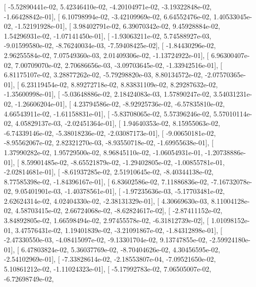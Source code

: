 \documentclass{article}
\begin{document}
       [ -5.52890441e-02,   5.42346410e-02,  -4.20104971e-02,
         -3.19322848e-02,  -1.66428842e-01],
       [  6.10798994e-02,  -3.42109969e-02,   6.64552476e-02,
          1.40533045e-02,  -1.52191928e-01],
       [  3.98402791e-02,   6.39070342e-02,   9.45928884e-02,
          1.54296931e-02,  -1.07141450e-01],
       [ -1.93063211e-02,   5.74588927e-03,  -9.01599580e-02,
         -8.76240034e-03,  -7.59408425e-02],
       [ -1.84430296e-02,   2.96255584e-02,   7.07549360e-03,
          2.01409306e-02,  -1.13724922e-01],
       [  6.96300407e-02,   7.00709070e-02,   2.70686656e-03,
         -3.09703645e-02,  -1.33942516e-01],
       [  6.81175107e-02,   3.28877262e-02,  -5.79298820e-03,
          8.80134572e-02,  -2.07570365e-01],
       [  6.23119454e-02,   8.89272718e-02,   8.83831109e-02,
          8.29287632e-02,  -1.35600998e-01],
       [ -5.03648886e-02,   2.18424083e-03,   1.57890247e-02,
          3.54031231e-02,  -1.26606204e-01],
       [  4.23794586e-02,  -8.92925736e-02,  -6.57835810e-02,
          4.66543911e-02,  -1.61158831e-01],
       [ -5.83708065e-02,   5.57396246e-02,   5.57010114e-02,
          4.05829137e-03,  -2.02451364e-01],
       [  1.94640353e-02,   8.15955063e-02,  -6.74339146e-02,
         -5.38018236e-02,  -2.03087173e-01],
       [ -9.00650181e-02,  -8.95562067e-02,   2.82321270e-03,
         -8.93550718e-02,  -1.69955638e-01],
       [  1.37990282e-02,   1.95729500e-02,   8.96845110e-02,
         -1.06054931e-01,  -1.20738886e-01],
       [  8.59901485e-02,  -8.65521879e-02,  -1.29402805e-02,
         -1.00855781e-01,  -2.02814681e-01],
       [ -8.61937285e-02,   2.51910645e-02,  -8.40344138e-02,
          8.77585398e-02,  -1.84396167e-01],
       [  6.83602586e-02,   7.11886836e-02,  -7.16732078e-02,
          9.05401901e-03,  -1.40378561e-01],
       [ -1.97235636e-03,  -5.17703481e-02,   2.62624314e-02,
          4.02404330e-02,  -2.38131329e-01],
       [  4.30669630e-03,   8.11004128e-02,   4.58703415e-02,
          2.66724068e-02,  -8.62824617e-02],
       [ -2.87411152e-02,   3.84892805e-02,   1.66598494e-02,
          2.97455578e-02,  -6.31812739e-02],
       [  1.01098152e-01,   3.47576431e-02,   1.19401839e-02,
         -3.21091867e-02,  -1.84312898e-01],
       [ -2.47330550e-03,  -4.08415097e-02,  -9.13301704e-02,
          9.13747855e-02,  -2.59924180e-01],
       [  6.47803824e-02,   5.36037769e-02,  -8.70404626e-02,
          4.30456595e-02,  -2.54102969e-01],
       [ -7.33828614e-02,  -2.18553807e-04,  -7.09521650e-02,
          5.10861212e-02,  -1.11024323e-01],
       [ -5.17992783e-02,   7.06505007e-02,  -6.72698749e-02,
\end{document}
